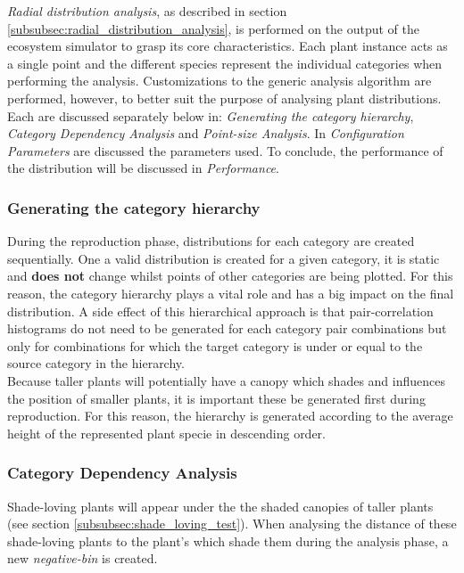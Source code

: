 \textit{Radial distribution analysis}, as described in section \ref{subsubsec:radial_distribution_analysis}, is performed on the output of the ecosystem simulator to grasp its core characteristics. Each plant instance acts as a single point and the different species represent the individual categories when performing the analysis. Customizations to the generic analysis algorithm are performed, however, to better suit the purpose of analysing plant distributions. Each are discussed separately below in: \textit{Generating the category hierarchy}, \textit{Category Dependency Analysis} and \textit{Point-size Analysis}. In \textit{Configuration Parameters} are discussed the parameters used. To conclude, the performance of the distribution will be discussed in \textit{Performance}.

\subsubsection{Generating the category hierarchy} \label{subsubsec:generating_cat_hierarchy}

During the reproduction phase, distributions for each category are created sequentially. One a valid distribution is created for a given category, it is static and \textbf{does not} change whilst points of other categories are being plotted. For this reason, the category hierarchy plays a vital role and has a big impact on the final distribution. A side effect of this hierarchical approach is that pair-correlation histograms do not need to be generated for each category pair combinations but only for combinations for which the target category is under or equal to the source category in the hierarchy.\\

Because taller plants will potentially have a canopy which shades and influences the position of smaller plants, it is important these be generated first during reproduction. For this reason, the hierarchy is generated according to the average height of the represented plant specie in descending order.

\subsubsection{Category Dependency Analysis} \label{subsubsec:category_dependency_analysis}

Shade-loving plants will appear under the the shaded canopies of taller plants (see section \ref{subsubsec:shade_loving_test}). When analysing the distance of these shade-loving plants to the plant's which shade them during the analysis phase, a new \textit{negative-bin} is created.\\


